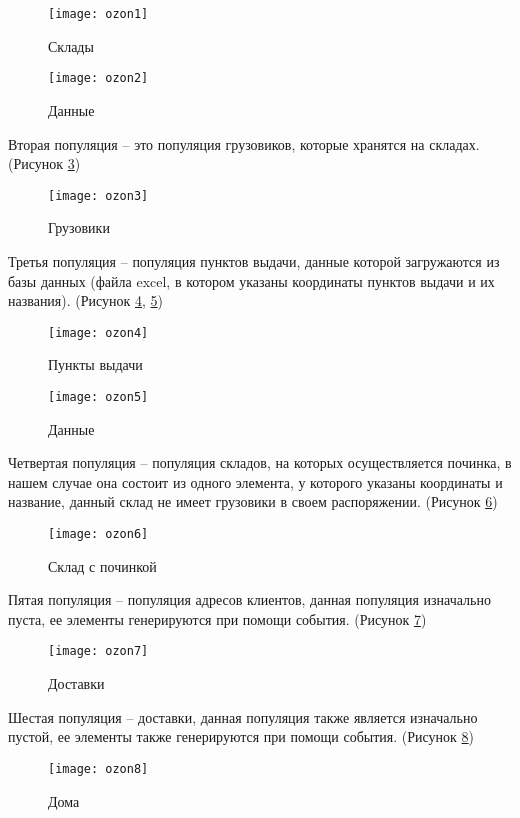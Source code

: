 \newpage

\begin{figure}[h]
	\centering \texttt{[image: ozon1]}
	\caption{Склады}
	\label{fig:ozon1}
\end{figure}

\begin{figure}[h]
	\centering \texttt{[image: ozon2]}
	\caption{Данные}
	\label{fig:ozon2}
\end{figure}

Вторая популяция – это популяция грузовиков, которые хранятся на складах. (Рисунок \ref{fig:ozon3})
\begin{figure}[h]
	\centering \texttt{[image: ozon3]}
	\caption{Грузовики}
	\label{fig:ozon3}
\end{figure}

\newpage

Третья популяция – популяция пунктов выдачи, данные которой загружаются из базы данных (файла excel, в котором указаны координаты пунктов выдачи и их названия). (Рисунок \ref{fig:ozon4}, \ref{fig:ozon5})
\begin{figure}[h]
	\centering \texttt{[image: ozon4]}
	\caption{Пункты выдачи}
	\label{fig:ozon4}
\end{figure}

\begin{figure}[h]
	\centering \texttt{[image: ozon5]}
	\caption{Данные}
	\label{fig:ozon5}
\end{figure}

Четвертая популяция –  популяция складов, на которых осуществляется починка, в нашем случае она состоит из одного элемента, у которого указаны координаты и название, данный склад не имеет грузовики в своем распоряжении. (Рисунок \ref{fig:ozon6})
\begin{figure}[h]
	\centering \texttt{[image: ozon6]}
	\caption{Склад с починкой}
	\label{fig:ozon6}
\end{figure}

\newpage

Пятая популяция – популяция адресов клиентов, данная популяция изначально пуста, ее элементы генерируются при помощи события. (Рисунок \ref{fig:ozon7})
\begin{figure}[h]
	\centering \texttt{[image: ozon7]}
	\caption{Доставки}
	\label{fig:ozon7}
\end{figure}

Шестая популяция – доставки, данная популяция также является изначально пустой, ее элементы также генерируются при помощи события. (Рисунок \ref{fig:ozon8})
\begin{figure}[h]
	\centering \texttt{[image: ozon8]}
	\caption{Дома}
	\label{fig:ozon8}
\end{figure}

